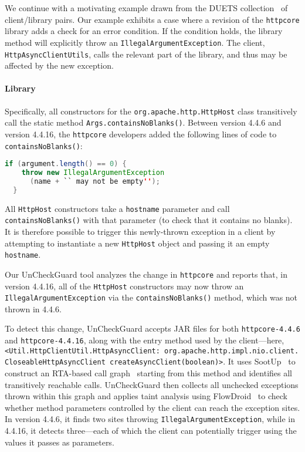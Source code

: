 We continue with a motivating example drawn from the DUETS collection~\cite{durieux21:_duets}
of client/library pairs. 
Our example exhibits a case
where a revision of the \texttt{httpcore} library adds a check for an
error condition.  If the condition holds, the library method will
explicitly throw an \texttt{IllegalArgumentException}. The client, \texttt{HttpAsyncClientUtils},
calls the relevant part of the library, and thus may be affected by the new exception.

\paragraph{Library} Specifically, all constructors for the \texttt{org.apache.http.HttpHost} class transitively call
the static method \texttt{Args.containsNoBlanks()}. Between version 4.4.6 and version 4.4.16, the \texttt{httpcore}
developers added the following lines of code to \texttt{containsNoBlanks()}:
\begin{lstlisting}[language=Java]
  if (argument.length() == 0) {
    throw new IllegalArgumentException
      (name + `` may not be empty'');
  }
\end{lstlisting}
All \texttt{HttpHost} constructors take a \texttt{hostname} parameter and call \texttt{containsNoBlanks()}
with that parameter (to check that it contains no blanks). It is therefore possible to trigger this newly-thrown
exception in a client by attempting to instantiate a new \texttt{HttpHost} object and passing it an empty
\texttt{hostname}.

Our UnCheckGuard tool analyzes the change in \texttt{httpcore} and reports that, in
version 4.4.16, all of the \texttt{HttpHost} constructors may now throw an
\texttt{IllegalArgumentException} via the \texttt{containsNoBlanks()} method, which
was not thrown in 4.4.6.

To detect this change, UnCheckGuard accepts JAR files for both \texttt{httpcore-4.4.6} and \texttt{httpcore-4.4.16}, along with the entry method used by the client---here, \texttt{<Util.HttpClientUtil.HttpAsyncClient: org.apache.http.impl.nio.client. CloseableHttpAsyncClient createAsyncClient(boolean)>}. It uses SootUp~\cite{Karakaya24:_sootup} to construct an RTA-based call graph~\cite{bacon96:_fast_static_analy_c_virtual_funct_calls} starting from this method and identifies all transitively reachable calls. UnCheckGuard then collects all unchecked exceptions thrown within this graph and applies taint analysis using FlowDroid~\cite{Arzt14:_flowdroid} to check whether method parameters controlled by the client can reach the exception sites. In version 4.4.6, it finds two sites throwing \texttt{IllegalArgumentException}, while in 4.4.16, it detects three—each of which the client can potentially trigger using the values it passes as parameters.

